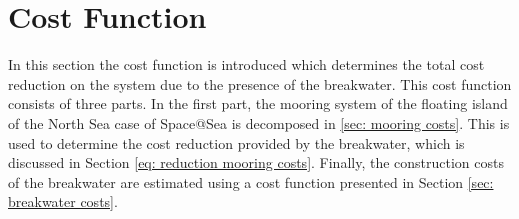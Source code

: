 




\section{Cost Function}
\label{sec: cost analysis methodology }
In this section the cost function is introduced which determines the total cost reduction on the system due to the presence of the breakwater. This cost function consists of three parts. In the first part, the mooring system of the floating island of the North Sea case of Space@Sea is decomposed in \ref{sec: mooring costs}. This is used to determine the cost reduction provided by the breakwater, which is discussed in Section \ref{eq: reduction mooring costs}. Finally, the construction costs of the breakwater are estimated using a cost function presented in Section \ref{sec: breakwater costs}.





